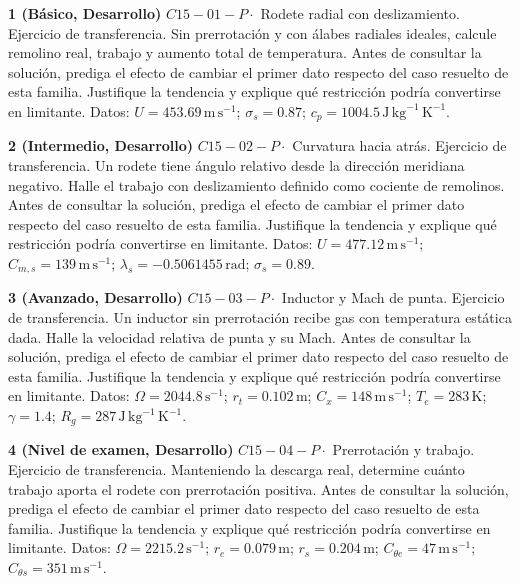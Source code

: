 \documentclass[10pt,openany]{book}
\begin{document}
\begin{tcolorbox}[title={Ejercicios propuestos}, studiumworked, breakable]

\noindent\textbf{1 (Básico, Desarrollo)}
\(C15-01-P \cdot\) Rodete radial con deslizamiento. Ejercicio de transferencia. Sin prerrotación y con álabes radiales ideales, calcule remolino real, trabajo y aumento total de temperatura. Antes de consultar la solución, prediga el efecto de cambiar el primer dato respecto del caso resuelto de esta familia. Justifique la tendencia y explique qué restricción podría convertirse en limitante. Datos: \(U=453.69\, \mathrm{m}\,\mathrm{s}^{-1}\); \(\sigma_s=0.87\); \(c_p=1004.5\, \mathrm{J}\,\mathrm{kg}^{-1}\,\mathrm{K}^{-1}\).

\noindent\textbf{2 (Intermedio, Desarrollo)}
\(C15-02-P \cdot\) Curvatura hacia atrás. Ejercicio de transferencia. Un rodete tiene ángulo relativo desde la dirección meridiana negativo. Halle el trabajo con deslizamiento definido como cociente de remolinos. Antes de consultar la solución, prediga el efecto de cambiar el primer dato respecto del caso resuelto de esta familia. Justifique la tendencia y explique qué restricción podría convertirse en limitante. Datos: \(U=477.12\, \mathrm{m}\,\mathrm{s}^{-1}\); \(C_{m,s}=139\, \mathrm{m}\,\mathrm{s}^{-1}\); \(\lambda_s=-0.5061455\, \mathrm{rad}\); \(\sigma_s=0.89\).

\noindent\textbf{3 (Avanzado, Desarrollo)}
\(C15-03-P \cdot\) Inductor y Mach de punta. Ejercicio de transferencia. Un inductor sin prerrotación recibe gas con temperatura estática dada. Halle la velocidad relativa de punta y su Mach. Antes de consultar la solución, prediga el efecto de cambiar el primer dato respecto del caso resuelto de esta familia. Justifique la tendencia y explique qué restricción podría convertirse en limitante. Datos: \(\Omega=2044.8\, \mathrm{s}^{-1}\); \(r_t=0.102\, \mathrm{m}\); \(C_x=148\, \mathrm{m}\,\mathrm{s}^{-1}\); \(T_e=283\, \mathrm{K}\); \(\gamma=1.4\); \(R_g=287\, \mathrm{J}\,\mathrm{kg}^{-1}\,\mathrm{K}^{-1}\).

\noindent\textbf{4 (Nivel de examen, Desarrollo)}
\(C15-04-P \cdot\) Prerrotación y trabajo. Ejercicio de transferencia. Manteniendo la descarga real, determine cuánto trabajo aporta el rodete con prerrotación positiva. Antes de consultar la solución, prediga el efecto de cambiar el primer dato respecto del caso resuelto de esta familia. Justifique la tendencia y explique qué restricción podría convertirse en limitante. Datos: \(\Omega=2215.2\, \mathrm{s}^{-1}\); \(r_e=0.079\, \mathrm{m}\); \(r_s=0.204\, \mathrm{m}\); \(C_{\theta e}=47\, \mathrm{m}\,\mathrm{s}^{-1}\); \(C_{\theta s}=351\, \mathrm{m}\,\mathrm{s}^{-1}\).
\end{tcolorbox}
\end{document}
